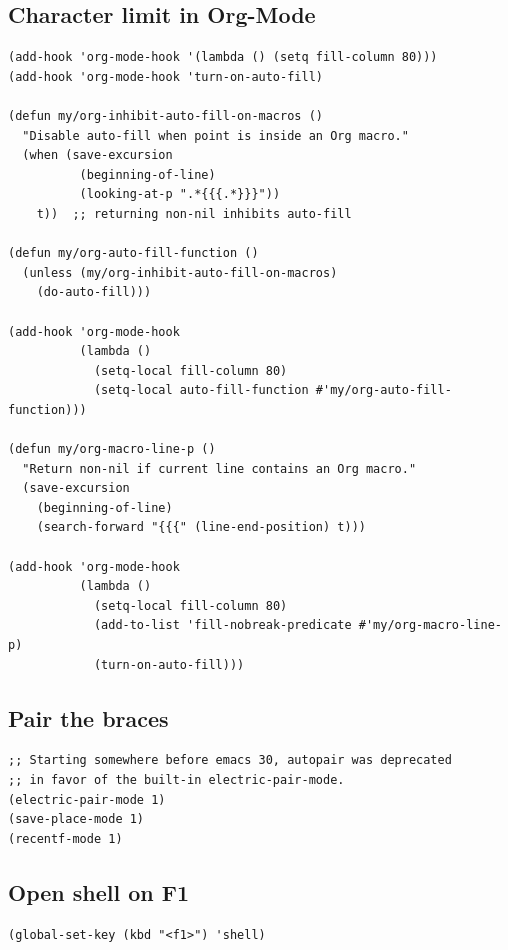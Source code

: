 \documentclass[10pt]{article}
\begin{document}
\subsection{Character limit in Org-Mode}
\label{sec:org579a84d}
\begin{verbatim}
(add-hook 'org-mode-hook '(lambda () (setq fill-column 80)))
(add-hook 'org-mode-hook 'turn-on-auto-fill)

(defun my/org-inhibit-auto-fill-on-macros ()
  "Disable auto-fill when point is inside an Org macro."
  (when (save-excursion
          (beginning-of-line)
          (looking-at-p ".*{{{.*}}}"))
    t))  ;; returning non-nil inhibits auto-fill

(defun my/org-auto-fill-function ()
  (unless (my/org-inhibit-auto-fill-on-macros)
    (do-auto-fill)))

(add-hook 'org-mode-hook
          (lambda ()
            (setq-local fill-column 80)
            (setq-local auto-fill-function #'my/org-auto-fill-function)))

(defun my/org-macro-line-p ()
  "Return non-nil if current line contains an Org macro."
  (save-excursion
    (beginning-of-line)
    (search-forward "{{{" (line-end-position) t)))

(add-hook 'org-mode-hook
          (lambda ()
            (setq-local fill-column 80)
            (add-to-list 'fill-nobreak-predicate #'my/org-macro-line-p)
            (turn-on-auto-fill)))
\end{verbatim}
\subsection{Pair the braces}
\label{sec:org7865559}
\begin{verbatim}
;; Starting somewhere before emacs 30, autopair was deprecated
;; in favor of the built-in electric-pair-mode.
(electric-pair-mode 1)
(save-place-mode 1)
(recentf-mode 1)
\end{verbatim}
\subsection{Open shell on F1}
\label{sec:org7828e5f}
\begin{verbatim}
(global-set-key (kbd "<f1>") 'shell)
\end{verbatim}
\end{document}
